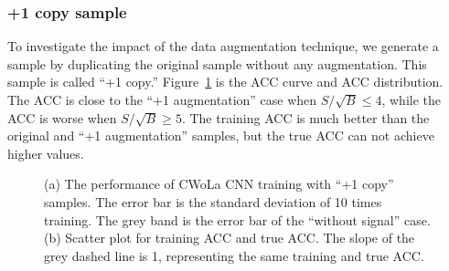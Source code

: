 \documentclass[12pt]{article}
\begin{document}
		\subsubsection{+1 copy sample}%
		\label{subs:_1_copy_sample}
			To investigate the impact of the data augmentation technique, we generate a sample by duplicating the original sample without any augmentation. This sample is called ``+1 copy.''
			Figure~\ref{fig:cwola_cnn_training_performance_copy_1} is the ACC curve and ACC distribution. The ACC is close to the ``+1 augmentation'' case when $S / \sqrt{B} \le 4$, while the ACC is worse when $S / \sqrt{B} \ge 5$. The training ACC is much better than the original and ``+1 augmentation'' samples, but the true ACC can not achieve higher values.
			\begin{figure}[htpb]
				\centering
				\caption{(a) The performance of CWoLa CNN training with ``+1 copy'' samples. The error bar is the standard deviation of 10 times training. The grey band is the error bar of the ``without signal'' case. (b) Scatter plot for training ACC and true ACC. The slope of the grey dashed line is 1, representing the same training and true ACC.}
				\label{fig:cwola_cnn_training_performance_copy_1}
			\end{figure}
\end{document}
